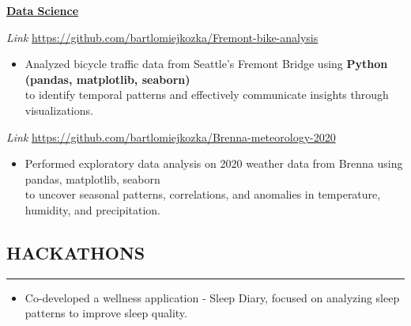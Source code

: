 \documentclass[9pt]{extarticle}
\begin{document}
\vspace{0.2cm}
\noindent\textbf{\underline{Data Science}}
\vspace{0.1cm}

\noindent
{} 
    \textit{Link} \href{https://github.com/bartlomiejkozka/Fremont-bike-analysis}{https://github.com/bartlomiejkozka/Fremont-bike-analysis} 
    \begin{itemize}[itemsep=-3pt, topsep=3pt]
    \item Analyzed bicycle traffic data from Seattle’s Fremont Bridge using \textbf{Python (pandas, matplotlib, seaborn)} \\
        to identify temporal patterns and effectively communicate insights through visualizations.
\end{itemize}

\noindent
{}
    \textit{Link} \href{https://github.com/bartlomiejkozka/Brenna-meteorology-2020}{https://github.com/bartlomiejkozka/Brenna-meteorology-2020}
\begin{itemize}[itemsep=-3pt, topsep=3pt]
    \item Performed exploratory data analysis on 2020 weather data from Brenna using pandas, matplotlib, seaborn \\
        to uncover seasonal patterns, correlations, and anomalies in temperature, humidity, and precipitation.
\end{itemize}


\subsection*{HACKATHONS}
\vspace{-1.5em}
\rule{\textwidth}{0.1pt}
\vspace{-0.5em}

\noindent
{}
\begin{itemize}[itemsep=-3pt, topsep=3pt]
    \item Co-developed a wellness application - Sleep Diary, focused on analyzing sleep patterns to improve sleep quality.
\end{itemize}
\end{document}
